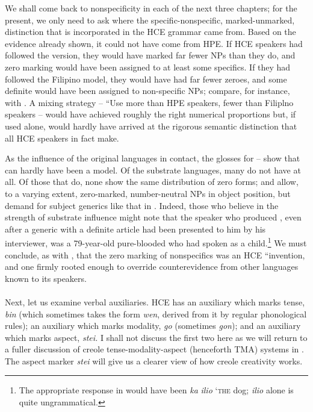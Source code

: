 We shall come back to nonspecificity in each of the next three chapters; for the present, we only need to ask where the specific-nonspecific, marked-unmarked, distinction that is incorporated in the HCE grammar came from. Based on the evidence already shown, it could not have come from HPE. If HCE speakers had followed the  version, they would have marked far fewer NPs than they do, and zero marking would have been assigned to at least some specifics. If they had followed the Filipino model, they would have had far fewer zeroes, and some definite  would have been assigned to non-specific NPs; compare, for instance,  with . A mixing strategy -- ``Use more  than  HPE speakers, fewer than Filiplno speakers -- would have achieved roughly the right numerical proportions but, if used alone, would hardly have arrived at the rigorous semantic distinction that all HCE speakers in fact make.

As the influence of the original languages in contact, the glosses for -- show that  can hardly have been a model. Of the substrate languages, many do not have  at all. Of those that do, none show the same distribution of zero forms;  and  allow, to a varying extent, zero-marked, number-neutral NPs in object position, but demand  for subject generics like that in . Indeed, those who believe in the strength of substrate
influence might note that the speaker who produced , even after a generic with a definite article had been presented to him by his inter\-viewer, was a 79-year-old pure-blooded  who had spoken  as a child.\footnote{The appropriate response in  would have been \textit{ka} \textit{ilio} `\textsc{the} dog; \textit{ilio} alone is quite ungrammatical.} We must conclude, as with , that the zero marking of nonspecifics was an HCE ``invention, and one firmly rooted enough to override counterevidence from other languages known to its speakers.\\\\

Next, let us examine verbal auxiliaries. HCE has an auxiliary which marks tense, \textit{bin} (which sometimes takes the form \textit{wen}, derived from it by regular phonological rules); an auxiliary which marks modality, \textit{go} (sometimes \textit{gon}); and an auxiliary which marks aspect, \textit{stei.} I shall not discuss the first two here as we will return to a fuller discus\-sion of creole tense-modality-aspect (henceforth TMA) systems in . The aspect marker \textit{stei} will give us a clearer view of how creole creativity works.

